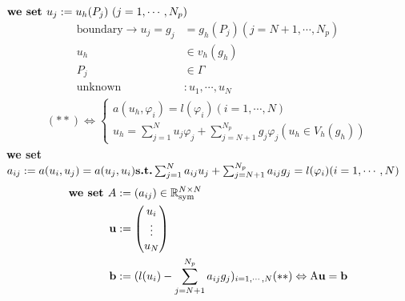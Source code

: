 \documentclass[]{report}
\newcommand{\R}{\mathbb{R}}
\begin{document}
$ \text{\textbf{we set }} u_j := u_h(P_j) \ (j=1, \cdots , N_p) $
\begin{align*}
\text{boundary} \rightarrow u_j = g_j &= g_h(P_j) (j=N+1, \cdots , N_p)\\
u_h & \in v_h(g_h)\\
P_j  & \in \Gamma\\
\text{unknown} & : u_1, \cdots , u_N
\end{align*}
\begin{align*}
(\ast \ast) \Leftrightarrow \begin{cases}
a(u_h, \varphi_i) = l(\varphi_i) (i=1, \cdots , N)\\
u_h = \sum_{j=1}^{N} u_j \varphi_j + \sum_{j=N+1}^{N_p} g_j \varphi_j (u_h \in V_h (g_h))
\end{cases}
\end{align*}
\textbf{we set} $ a_{ij} := a(u_i, u_j) = a(u_j, u_i)\\
\text{\textbf{s.t.}} \sum_{j=1}^{N} a_{ij} u_{j} + \sum_{j=N+1}^{N_p} a_{ij} g_j = l(\varphi_i) (i=1, \cdots , N) $
\begin{align*}
\text{\textbf{we set }} A &:= (a_{ij}) \in \R_{\text{sym}}^{N \times N}\\
\text{\textbf{u}} &:= \begin{pmatrix}
u_i \\
\vdots \\
u_N
\end{pmatrix}\\
\text{\textbf{b}} &:= (l(u_i) - \sum_{j=N+1}^{N_p} a_{ij} g_j)_{i=1, \cdots , N}
(\ast \ast) \Leftrightarrow \text{A} \textbf{\text{u}} = \textbf{b}
\end{align*}
\end{document}
